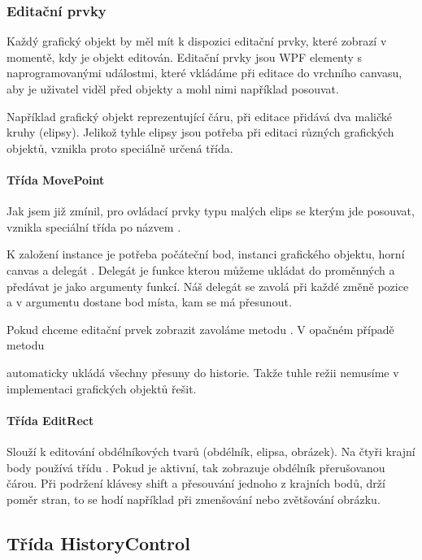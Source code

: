 \documentclass[
  field=inf,
  biblatex,
  glossaries,
  index
]{kidiplom}
\begin{document}
\subsubsection{Editační prvky}
Každý grafický objekt by měl mít k dispozici editační prvky, které zobrazí v momentě, kdy je objekt editován. Editační prvky jsou WPF elementy s naprogramovanými událostmi, které vkládáme při editace do vrchního canvasu, aby je uživatel viděl před objekty a mohl nimi například posouvat.

Například grafický objekt reprezentující čáru, při editace přidává dva maličké kruhy (elipsy). Jelikož tyhle elipsy jsou potřeba při editaci různých grafických objektů, vznikla proto speciálně určená třída.

\paragraph{Třída MovePoint}
Jak jsem již zmínil, pro ovládací prvky typu malých elips se kterým jde posouvat, vznikla speciální třída po názvem .

K založení instance je potřeba počáteční bod, instanci grafického objektu, horní canvas a delegát . Delegát je funkce kterou můžeme ukládat do proměnných  a předávat je jako argumenty funkcí. Náš delegát se zavolá při každé změně pozice a v argumentu dostane bod místa, kam se má přesunout.

Pokud chceme editační prvek zobrazit zavoláme metodu . V opačném případě metodu 

 automaticky ukládá všechny přesuny do historie. Takže tuhle režii nemusíme v implementaci grafických objektů řešit.

\paragraph{Třída EditRect}

Slouží k editování obdélníkových tvarů (obdélník, elipsa, obrázek). Na čtyři krajní body používá třídu . Pokud je aktivní, tak zobrazuje obdélník přerušovanou čárou. Při podržení klávesy shift a přesouvání jednoho z krajních bodů, drží poměr stran, to se hodí například při zmenšování nebo zvětšování obrázku.

\subsection{Třída HistoryControl}
\end{document}
